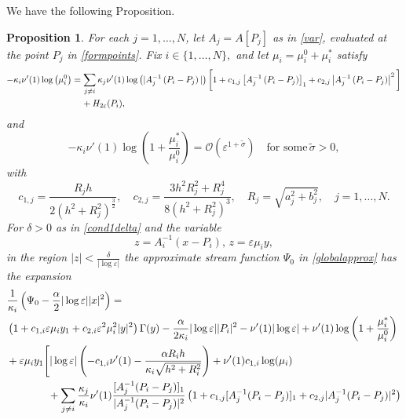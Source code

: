 \documentclass[11pt,reqno,a4paper]{amsart}
\numberwithin{equation}{section}
\newcommand{\ve}{\varepsilon}
\newtheorem{prop}{Proposition}[section]
\begin{document}
We have the following Proposition.
\begin{prop}\label{propscaling}
For each $j=1,\dots,N$, let $A_j=A[P_j]$ as in \eqref{var}, evaluated at the point $P_j$ in \eqref{formpoints}.  Fix $i\in\{1,\dots,N\},$ and let $\mu_i=\mu_i^0 +\mu_i^*$ satisfy
\begin{equation}\label{scalingmain}
\begin{aligned}
-\kappa_i\nu'(1)\log\left(\mu_{i}^{0}\right)&=\sum_{j\neq i} \kappa_j\nu'(1)\log\left(|A_j^{-1}\left(P_i-P_j\right)|\right)\bigg[1+c_{1,j}\left[A_j^{-1}\left(P_i-P_j\right)\right]_{1}+c_{2,j}\left|A_j^{-1}\left(P_i-P_j\right)\right|^2\bigg]\\
&\hspace{4mm}+H_{2\ve}(P_i),
\end{aligned}
\end{equation}
and
\begin{equation}\label{scalingpert}
-\kappa_i\nu'(1)\log\left(1+\frac{\mu_i^{*}}{\mu_i^{0}}\right)=\mathcal{O}\left(\ve^{1+\tilde\sigma}\right)\quad \mbox{for some} \, \tilde\sigma>0,
\end{equation}
with 
\begin{equation}\label{constantsj}
    c_{1,j}=\frac{R_j h}{2(h^2+R_j^2)^{\frac 3 2}},\quad c_{2,j}=\frac{3h^2R_j^2+R_j^4}{8(h^2+R_j^2)^3}, \quad R_j=\sqrt{a_j^2+b_j^2}, \quad j=1,\dots,N.
\end{equation}
For $\delta>0$ as in \eqref{cond1delta} and the variable \[z=A_i^{-1}(x-P_i),\, z=\ve\mu_i y,\] in the region $|z|<\frac{\delta}{|\log\ve|}$ the approximate stream function $\Psi_{0}$ in \eqref{globalapprox} has the expansion
\begin{equation}\label{exppsiminusfinal}
\begin{aligned}
&\frac{1}{\kappa_{i}}\left(\Psi_{0}-\frac{\alpha}{2}|\log\ve||x|^2\right)=\\
&\left(1+c_{1,i}\ve\mu_{i}y_1+c_{2,i}\ve^2\mu_{i}^2|y|^2\right)\Gamma(y) -\frac{\alpha}{2\kappa_{i}}|\log\ve||P_i|^2-\nu'(1)|\log\ve|+\nu'(1)\log\left(1+\frac{\mu_{i}^{*}}{\mu_{i}^{0}}\right)\\
&+\ve \mu_{i}y_1\Bigg[|\log\ve|\left(-c_{1,i}\nu'(1)-\frac{\alpha R_i h}{\kappa_i\sqrt{h^2+R_i^2}}\right)+\nu'(1)c_{1,i}\log(\mu_{i})\\
&\hspace{14mm}+\sum_{j\neq i}\frac{\kappa_j}{\kappa_i}\nu'(1)\frac{[A_j^{-1}(P_i-P_j)]_1}{|A_j^{-1}(P_i-P_j)|^2}\left(1+c_{1,j}[A_j^{-1}(P_i-P_j)]_1+c_{2,j}|A_{j}^{-1}(P_i-P_j)|^2\right)\\

\end{aligned}
\end{equation}
\end{prop}
\end{document}

